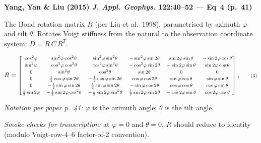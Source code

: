 \noindent\textbf{Yang, Yan \& Liu (2015) \emph{J. Appl. Geophys.} 122:40--52 — Eq~4 (p.~41)}

\smallskip

\noindent The Bond rotation matrix $R$ (per Liu et al.~1998), parametrised
by azimuth $\varphi$ and tilt $\theta$. Rotates Voigt stiffness from the
natural to the observation coordinate system: $D = R\,C\,R^T$.

\smallskip

\begin{equation*}
R =
{\scriptsize
\begin{bmatrix}
\cos^2\!\varphi               & \sin^2\!\varphi\cos^2\!\theta         & \sin^2\!\varphi\sin^2\!\theta         & -\sin^2\!\varphi\sin 2\theta            & \sin 2\varphi\sin\theta         & -\sin 2\varphi\cos\theta            \\[2pt]
\sin^2\!\varphi               & \cos^2\!\varphi\cos^2\!\theta         & \cos^2\!\varphi\sin^2\!\theta         & -\cos^2\!\varphi\sin 2\theta            & -\sin 2\varphi\sin\theta        & \sin 2\varphi\cos\theta             \\[2pt]
0                              & \sin^2\!\theta                         & \cos^2\!\theta                         & \sin 2\theta                              & 0                                & 0                                    \\[2pt]
0                              & \tfrac{1}{2}\cos\varphi\sin 2\theta   & -\tfrac{1}{2}\cos\varphi\sin 2\theta  & \cos\varphi\cos 2\theta                  & \sin\varphi\cos\theta            & \sin\varphi\sin\theta               \\[2pt]
0                              & -\tfrac{1}{2}\sin\varphi\sin 2\theta  & \tfrac{1}{2}\sin\varphi\sin 2\theta   & -\sin\varphi\cos 2\theta                 & \cos\varphi\cos\theta            & \cos\varphi\sin\theta               \\[2pt]
\tfrac{1}{2}\sin 2\varphi      & -\tfrac{1}{2}\sin 2\varphi\cos^2\!\theta & -\tfrac{1}{2}\sin 2\varphi\sin^2\!\theta & \tfrac{1}{2}\sin 2\varphi\sin 2\theta & -\cos 2\varphi\sin\theta         & \cos 2\varphi\cos\theta
\end{bmatrix},
\tag{4}}
\end{equation*}

\smallskip

\noindent\textit{Notation per paper p.~41:}
$\varphi$ is the azimuth angle;
$\theta$ is the tilt angle.

\smallskip

\noindent\textit{Smoke-checks for transcription:} at $\varphi=0$ and $\theta=0$,
$R$ should reduce to identity (modulo Voigt-row-4--6 factor-of-2 convention).
